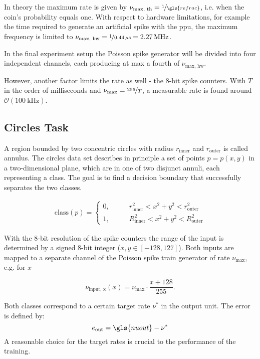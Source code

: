 In theory the maximum rate is given by $\nu_\text{max, th} = \nicefrac{1}{\gls{refrac}}$, i.e. when the coin's probability equals one. With respect to hardware limitations, for example the time required to generate an artificial spike with the \gls{ppu}, the maximum frequency is limited to $\nu_\text{max, hw} = \nicefrac{1}{\SI{0.44}{\mu \s}} = \SI{2.27}{\mega \Hz}$.

In the final experiment setup the Poisson spike generator will be divided into four independent channels, each producing at max a fourth of $\nu_\text{max, hw}$.

However, another factor limits the rate as well - the 8-bit spike counters. With $T$ in the order of milliseconds and $\nu_\text{max} = \nicefrac{256}{T}$, a measurable rate is found around $\mathcal{O}(\SI{100}{\kilo \Hz})$.

\subsection{Circles Task}
A region bounded by two concentric circles with radius $r_{\text{inner}}$ and $r_{\text{outer}}$ is called annulus. The circles data set describes in principle a set of points $p = p(x,y)$ in a two-dimensional plane, which are in one of two disjunct annuli, each representing a class. The goal is to find a decision boundary that successfully separates the two classes.

\begin{align}
\text{class}(p) =
\begin{cases}
0 ,&\quad \quad r_{\text{inner}}^2 < x^2 + y^2 < r_{\text{outer}}^2 \\
1 ,&\quad \quad R_{\text{inner}}^2 < x^2 + y^2 < R_{\text{outer}}^2
\end{cases}
\end{align}

With the 8-bit resolution of the spike counters the range of the input is determined by a signed 8-bit integer ($x, y \in [-128,127]$). Both inputs are mapped to a separate channel of the Poisson spike train generator of rate $\nu_\text{max}$, e.g. for $x$

\begin{equation}\label{inputfrequency}
\nu_{\text{input, x}}(x) = \nu_\text{max} \cdot \frac{x + 128}{255}.
\end{equation}

Both classes correspond to a certain target rate $\nu^*$ in the output unit. The error is defined by:
\begin{equation}
\label{circleserror}
e_\text{out} = \gls{nuout} - \nu^*
\end{equation}
A reasonable choice for the target rates is crucial to the performance of the training. 

